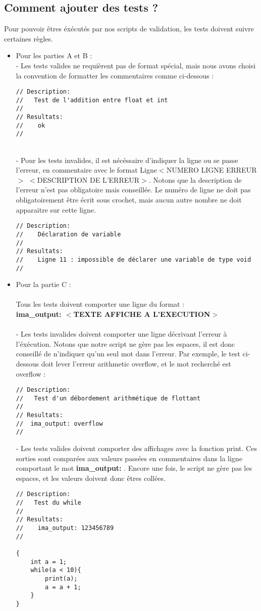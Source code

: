 \documentclass[11pt]{article}
\begin{document}
\subsection{Comment ajouter des tests ?}
Pour pouvoir êtres éxécutés par nos scripts de validation, les tests doivent suivre certaines règles.
\begin{itemize}
\item Pour les parties A et B : \\
- Les tests valides ne requièrent pas de format spécial, mais nous avons choisi la convention de formatter les commentaires comme ci-dessous :
\begin{verbatim}
// Description:
//   Test de l'addition entre float et int
//
// Resultats:
//    ok
// 
\end{verbatim}
~\\
- Pour les tests invalides, il est nécéssaire d'indiquer la ligne ou se passe l'erreur, en commentaire avec le format Ligne$<$NUMERO LIGNE ERREUR$>$ $<$DESCRIPTION DE L'ERREUR$>$. Notons que la description de l'erreur n'est pas obligatoire mais conseillée. Le numéro de ligne ne doit pas obligatoirement être écrit sous crochet, mais aucun autre nombre ne doit apparaitre sur cette ligne. \\
\begin{verbatim}
// Description:
//    Déclaration de variable
//
// Resultats:
//    Ligne 11 : impossible de déclarer une variable de type void
// 
\end{verbatim}
\item Pour la partie C : \\ \\
Tous les tests doivent comporter une ligne du format :\\ \textbf{ima\_output: $<$TEXTE AFFICHE A L'EXECUTION$>$} \\ \\
- Les tests invalides doivent comporter une ligne décrivant l'erreur à l'éxécution. Notons que notre script ne gère pas les espaces, il est donc conseillé de n'indiquer qu'un seul mot dans l'erreur. Par exemple, le test ci-dessous doit lever l'erreur arithmetic overflow, et le mot recherché est overflow : 
\begin{verbatim}
// Description:
//   Test d'un débordement arithmétique de flottant
//
// Resultats:
//  ima_output: overflow
//
\end{verbatim}
- Les tests valides doivent comporter des affichages avec la fonction print. Ces sorties sont comparées aux valeurs passées en commentaires dans la ligne comportant le mot \textbf{ima\_output:} . Encore une fois, le script ne gère pas les espaces, et les valeurs doivent donc êtres collées.
\begin{verbatim}
// Description:
//   Test du while
//
// Resultats:
//    ima_output: 123456789
//

{
    int a = 1;
    while(a < 10){
        print(a);
        a = a + 1;
    }
}
\end{verbatim}
\end{itemize}
\end{document}

